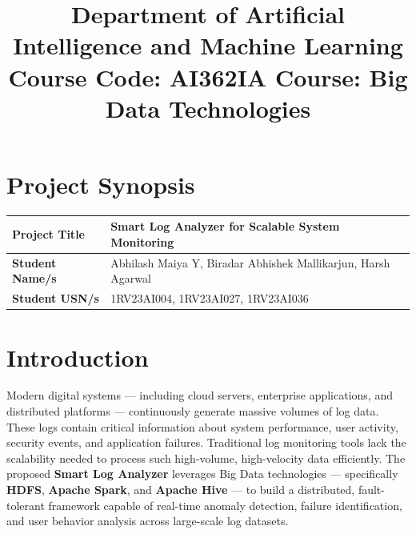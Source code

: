 \documentclass[12pt, a4paper]{article}
\title{\vspace{-2cm}\textbf{Department of Artificial Intelligence and Machine Learning}\\
\large Course Code: AI362IA \hspace{1cm} Course: Big Data Technologies}
\date{}
\begin{document}
\maketitle
\vspace{-1.5cm}

\section*{Project Synopsis}

\begin{table}[h!]
\centering
\renewcommand{\arraystretch}{1.5}
\begin{tabularx}{\textwidth}{|l|X|}
\hline
\textbf{Project Title} & \textbf{Smart Log Analyzer for Scalable System Monitoring} \\ \hline
\textbf{Student Name/s} & Abhilash Maiya Y, Biradar Abhishek Mallikarjun, Harsh Agarwal \\ \hline
\textbf{Student USN/s} & 1RV23AI004, 1RV23AI027, 1RV23AI036 \\ \hline
\end{tabularx}
\end{table}

\section*{Introduction}
Modern digital systems --- including cloud servers, enterprise applications, and distributed platforms --- continuously generate massive volumes of log data. These logs contain critical information about system performance, user activity, security events, and application failures. Traditional log monitoring tools lack the scalability needed to process such high-volume, high-velocity data efficiently. The proposed \textbf{Smart Log Analyzer} leverages Big Data technologies --- specifically \textbf{HDFS}, \textbf{Apache Spark}, and \textbf{Apache Hive} --- to build a distributed, fault-tolerant framework capable of real-time anomaly detection, failure identification, and user behavior analysis across large-scale log datasets.
\end{document}

